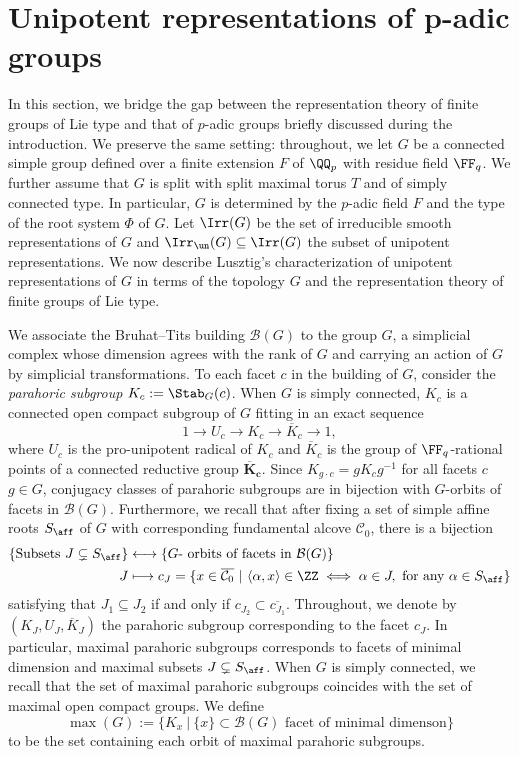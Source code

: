 \section{Unipotent representations of p-adic groups} \label{sec:padic_groups}
In this section, we bridge the gap between the representation theory of finite groups of Lie type and that of $p$-adic groups briefly discussed during the introduction. We preserve the same setting: throughout, we let $G$ be a connected simple group defined over a finite extension $F$ of $\QQ_p$ with residue field $\FF_q$. We further assume that $G$ is split with split maximal torus $T$ and of simply connected type. In particular, $G$ is determined by the $p$-adic field $F$ and the type of the root system $\Phi$ of $G$. Let $\Irr(G)$ be the set of irreducible smooth representations of $G$ and $\Irr_{\un}(G)\subseteq\Irr(G)$ the subset of unipotent representations. We now describe Lusztig's characterization of unipotent representations of $G$ in terms of the topology $G$ and the representation theory of finite groups of Lie type.

We associate the Bruhat--Tits building $\mathcal{B}(G)$ to the group $G$, a simplicial complex whose dimension agrees with the rank of $G$ and carrying an action of $G$ by simplicial transformations. To each facet $c$ in the building of $G$, consider the \textit{parahoric subgroup} $K_c:=\Stab_G(c)$. When $G$ is simply connected, $K_c$ is a connected open compact subgroup of $G$ fitting in an exact sequence
$$1\longrightarrow U_c\longrightarrow K_c\longrightarrow \overline{K}_c\longrightarrow 1,$$
where $U_c$ is the pro-unipotent radical of $K_c$ and $\overline{K}_c$ is the group of $\FF_q$-rational points of a connected reductive group $\mathbf{\overline{K}_c}$. Since $K_{g\cdot c}=gK_cg^{-1}$ for all facets $c$ $g\in G$, conjugacy classes of parahoric subgroups are in bijection with $G$-orbits of facets in $\mathcal{B}(G)$. Furthermore, we recall that after fixing a set of simple affine roots $S_{\aff}$ of $G$ with corresponding fundamental alcove $\mathcal{C}_0$, there is a bijection
\begin{align*}
    \{\text{Subsets }J\subsetneq S_{\aff}\}&\longleftrightarrow\{G\text{- orbits of facets in }\mathcal{B}(G)\}\\
    J&\longmapsto c_J=\{x\in\overline{\mathcal{C}_0}\ |\ \langle\alpha,x\rangle\in\ZZ\iff\alpha\in J,\text{ for any }\alpha\in S_{\aff}\}
\end{align*}
satisfying that $J_1\subseteq J_2$ if and only if $c_{J_2}\subset \overline{c_{J_1}}$. Throughout, we denote by $(K_J,U_J,\overline{K}_J)$ the parahoric subgroup corresponding to the facet $c_J$. In particular, maximal parahoric subgroups corresponds to facets of minimal dimension and maximal subsets $J\subsetneq S_{\aff}$. When $G$ is simply connected, we recall that the set of maximal parahoric subgroups coincides with the set of maximal open compact groups. We define $$\max(G):=\{K_x\ |\ \{x\}\subset\mathcal{B}(G)\text{ facet of minimal dimenson}\}$$
to be the set containing each orbit of maximal parahoric subgroups.

